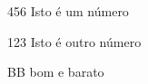
\begin{siglas}
  \item[456] Isto é um número
  \item[123] Isto é outro número
  \item[BB] bom e barato 
\end{siglas}

